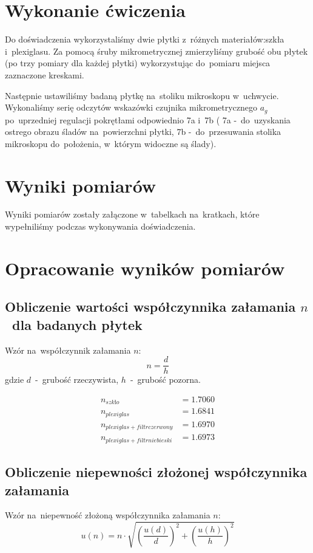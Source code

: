 \documentclass{fizraport}
\begin{document}
\section{Wykonanie ćwiczenia}
Do doświadczenia wykorzystaliśmy dwie płytki z~różnych materiałów:szkła i~plexiglasu. Za pomocą śruby mikrometrycznej zmierzyliśmy grubość obu płytek (po trzy pomiary dla każdej płytki) wykorzystując do~pomiaru miejsca zaznaczone kreskami.

Następnie ustawiliśmy badaną płytkę na~stoliku mikroskopu w~uchwycie.\\ Wykonaliśmy serię odczytów wskazówki czujnika mikrometrycznego $a_g$ po~uprzedniej regulacji pokrętłami odpowiednio 7a i~7b ( 7a -~do~uzyskania ostrego obrazu śladów na~powierzchni płytki, 7b -~do~przesuwania stolika mikroskopu do~położenia, w~którym widoczne są ślady).

\section{Wyniki pomiarów}
Wyniki pomiarów zostały załączone w~tabelkach na~kratkach, które wypełniliśmy podczas wykonywania doświadczenia.
\newpage
\addtocounter{page}{2}

\section{Opracowanie wyników pomiarów}
\subsection{Obliczenie wartości współczynnika załamania $n$~dla badanych płytek}
Wzór na~współczynnik załamania $n$:
\begin{equation}
    n=\frac{d}{h}
\end{equation}
gdzie $d$~-~grubość rzeczywista, $h$~-~grubość pozorna.

\begin{equation*}
\begin{split}
n_{szkło}&=1.7060 \\
n_{plexiglas}&=1.6841 \\
n_{plexiglas+filtr czerwony}&=1.6970 \\
n_{plexiglas+filtr niebieski}&=1.6973 
\end{split}
\end{equation*}


\subsection{Obliczenie niepewności złożonej współczynnika załamania}
Wzór na~niepewność złożoną współczynnika załamania $n$:
\begin{equation}
    \label{eq:nniep}
    u(n)=n\cdot\sqrt{\left(\frac{u(d)}{d} \right )^2 + \left(\frac{u(h)}{h} \right )^2}
\end{equation}
\end{document}
